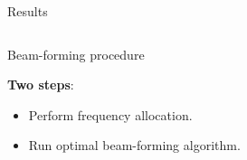 \documentclass[../main.tex]{subfiles}
\begin{document}
\begin{frame}[t]{Results}


\begin{columns}[t]
        \begin{column}{0.55\textwidth}
            \centering
            \begin{adjustbox}{width=1\columnwidth}
            
            \end{adjustbox}
        \end{column}
        \begin{column}{0.55\textwidth}
            \centering
            \begin{adjustbox}{width=1\columnwidth}
            
            \end{adjustbox}
        \end{column}
\end{columns}   

\end{frame}



\begin{frame}[t]{Beam-forming procedure}
 
\textbf{Two steps}:
\begin{itemize}
    \item Perform frequency allocation.
    \item Run optimal beam-forming algorithm.
\end{itemize}



\end{frame}


%
%
\end{document}
